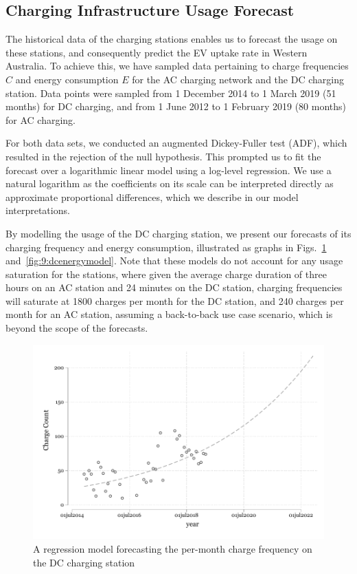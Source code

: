 \subsection{Charging Infrastructure Usage Forecast}
The historical data of the charging stations enables us to forecast the usage on these stations, and consequently predict the EV uptake rate in Western Australia. To achieve this, we have sampled data pertaining to charge frequencies $C$ and energy consumption $E$ for the AC charging network and the DC charging station. Data points were sampled from 1 December 2014 to 1 March 2019 (51 months) for DC charging, and from 1 June 2012 to 1 February 2019 (80 months) for AC charging.


For both data sets, we conducted an augmented Dickey-Fuller test (ADF), which resulted in the rejection of the null hypothesis. This prompted us to fit the forecast over a logarithmic linear model using a log-level regression. We use a natural logarithm as the coefficients on its scale can be interpreted directly as approximate proportional differences, which we describe in our model interpretations.


By modelling the usage of the DC charging station, we present our forecasts of its charging frequency and energy consumption, illustrated as graphs in Figs.~\ref{fig:9:dccountmodel} and~\ref{fig:9:dcenergymodel}. Note that these models do not account for any usage saturation for the stations, where given the average charge duration of three hours on an AC station and 24 minutes on the DC station, charging frequencies will saturate at 1800 charges per month for the DC station, and 240 charges per month for an AC station, assuming a back-to-back use case scenario, which is beyond the scope of the forecasts.

\begin{figure}[H]
	\centering
	\includegraphics[width=0.9\linewidth]{DC_5_1}
	\caption[DC charge frequency regression model]{A regression model forecasting the per-month charge frequency on the DC charging station}
	\label{fig:9:dccountmodel}
\end{figure}

